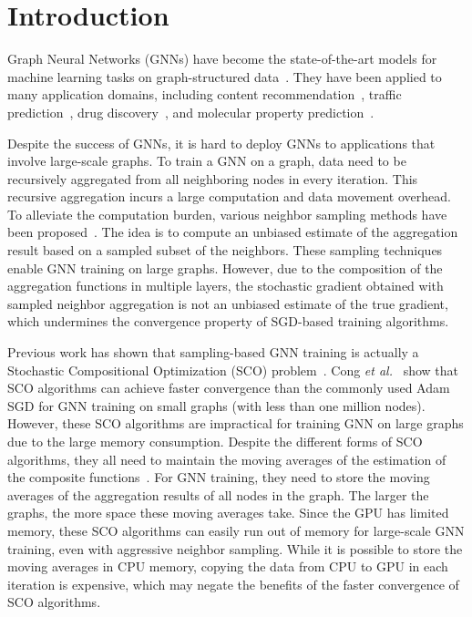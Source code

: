 \section{Introduction}
Graph Neural Networks (GNNs) have become the state-of-the-art models for machine learning tasks on graph-structured data~\cite{kipf2017semi, duran2017learning, zhang2017weisfeiler, zhang2018link, ying2018hierarchical, gilmer2017neural}. 
They have been applied to many application domains, including content recommendation~\cite{ying2018graph}, traffic prediction~\cite{zhang2018gaan},  drug discovery~\cite{li2018learning}, and molecular property prediction~\cite{gilmer2017neural}.  

Despite the success of GNNs, it is hard to deploy GNNs to applications that involve large-scale graphs. 
To train a GNN on a graph, data need to be recursively aggregated from all neighboring nodes in every iteration. 
This recursive aggregation incurs a large computation and data movement overhead. 
To alleviate the computation burden, various neighbor sampling methods have been proposed~\cite{hamilton2017inductive, ying2018graph, chen2018fastgcn, zou2019layer, AAAI1816642, chiang2019cluster, Zeng2020GraphSAINT}. 
The idea is to compute an unbiased estimate of the aggregation result based on a sampled subset of the neighbors. 
These sampling techniques enable GNN training on large graphs. 
However, 
due to the composition of the aggregation functions in multiple layers, 
the stochastic gradient obtained with sampled neighbor aggregation is not an unbiased estimate of the true gradient, which undermines the convergence property of SGD-based training algorithms. 

Previous work has shown that sampling-based GNN training is actually a Stochastic Compositional Optimization (SCO) problem~\cite{cong2020minimal,  cong2021importance}. 
Cong {\em et al.}~\cite{cong2021importance} show that SCO algorithms can achieve faster convergence than the commonly used Adam SGD for GNN training on small graphs (with less than one million nodes). 
However, these SCO algorithms are impractical for training GNN on large graphs due to the large memory consumption. 
Despite the different forms of SCO algorithms, they all need to maintain the moving averages of the estimation of the composite functions~\cite{yang2019multilevel, balasubramanian2020stochastic, chen2020solving, lian2017finite, wang2017accelerating, ghadimi2020single}. 
For GNN training, they need to store the moving averages of the aggregation results of all nodes in the graph. 
The larger the graphs, the more space these moving averages take. 
Since the GPU has limited memory, these SCO algorithms can easily run out of memory for large-scale GNN training, even with aggressive neighbor sampling. 
While it is possible to store the moving averages in CPU memory, copying the data from CPU to GPU in each iteration is expensive, which may negate the benefits of the faster convergence of SCO algorithms. 

